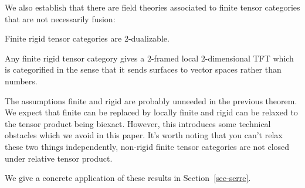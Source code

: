 \documentclass{amsart}
\begin{document}

We also establish that there are field theories associated to finite tensor categories that are not necessarily fusion:

\begin{theorem}
Finite rigid tensor categories are $2$-dualizable.
\end{theorem}

\begin{corollary}
Any finite rigid tensor category gives a $2$-framed local $2$-dimensional TFT which is categorified in the sense that it sends surfaces to vector spaces rather than numbers.
\end{corollary}

\begin{remark}
The assumptions finite and rigid are probably unneeded in the previous theorem.  We expect that finite can be replaced by locally finite and rigid can be relaxed to the tensor product being biexact.  However, this introduces some technical obstacles which we avoid in this paper.  It's worth noting that you can't relax these two things independently, non-rigid finite tensor categories are not closed under relative tensor product.
\end{remark}

We give a concrete application of these results in  Section~\ref{sec-serre}.

\end{document}
